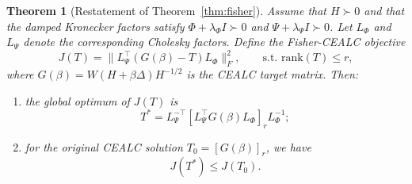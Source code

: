\documentclass[a4paper,fleqn]{cas-dc}
\newtheorem*{theorem*}{Theorem}
\begin{document}
\begin{theorem*}[Restatement of Theorem~\ref{thm:fisher}]
Assume that $H \succ 0$ and that the damped Kronecker factors satisfy $\Phi + \lambda_\Phi I \succ 0$ and $\Psi + \lambda_\Psi I \succ 0$. Let $L_\Phi$ and $L_\Psi$ denote the corresponding Cholesky factors. Define the Fisher-CEALC objective
\begin{equation}
J(T) = \|L_\Psi^{\top}(G(\beta)-T)L_\Phi\|_F^2,
\qquad \text{s.t. } \mathrm{rank}(T) \le r,
\end{equation}
where $G(\beta) = W(H+\beta\Delta)H^{-1/2}$ is the CEALC target matrix. Then:
\begin{enumerate}[leftmargin=1.5em,label=(\arabic*)]
    \item the global optimum of $J(T)$ is
    \begin{equation}
    T^* = L_\Psi^{-\top}[L_\Psi^{\top}G(\beta)L_\Phi]_r L_\Phi^{-1};
    \end{equation}
    \item for the original CEALC solution $T_0=[G(\beta)]_r$, we have
    \begin{equation}
    J(T^*) \le J(T_0).
    \end{equation}
\end{enumerate}
\end{theorem*}
\end{document}
